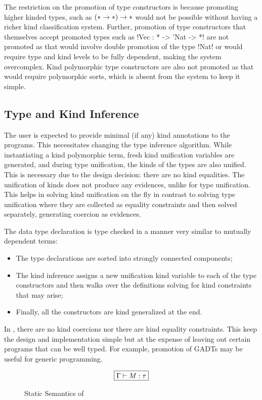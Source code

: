 \documentclass[manuscript,screen,nonacm]{acmart}
\begin{document}
The restriction on the promotion of type constructors is because promoting higher kinded types, such as $(\ast \to \ast) \to \ast$ would not be possible without having a richer kind classification system. Further, promotion of type constructors that themselves accept promoted types such as !Vec : * -> 'Nat -> *! are not promoted as that would involve double promotion of the type !Nat! or would require type and kind levels to be fully dependent, making the system overcomplex. Kind polymorphic type constructors are also not promoted as that would require polymorphic sorts, which is absent from the system to keep it simple.

\subsection{Type and Kind Inference}
The user is expected to provide minimal (if any) kind annotations to the programs. This necessitates changing the type inference algorithm. While instantiating a kind polymorphic term, fresh kind unification variables are generated, and during type unification, the kinds of the types are also unified. This is necessary due to the design decision: there are no kind equalities. The unification of kinds does not produce any evidences, unlike for type unification. This helps in solving kind unification on the fly in contrast to solving type unification where they are collected as equality constraints and then solved separately, generating coercion as evidences.

The data type declaration is type checked in a manner very similar to mutually dependent terms:
\begin{itemize}
\item The type declarations are sorted into strongly connected components;
\item The kind inference assigns a new unification kind variable to each of the type constructors and then walks over the definitions solving for kind constraints that may arise;
\item Finally, all the constructors are kind generalized at the end.
\end{itemize}


In \SFP, there are no kind coercions nor there are kind equality constraints. This keep the design and implementation simple but at the expense of leaving out certain programs that can be well typed. For example, promotion of GADTs may be useful for generic programming.


\begin{figure}[ht]
  \centering
  \begin{gather*}
    \fbox{$\Gamma \vdash M : \tau$}
  \end{gather*}
  \caption{Static Semantics of \SFP}
  \label{fig:sfp-typing}
\end{figure}
\end{document}
